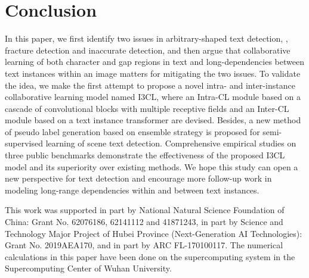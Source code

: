 \section{Conclusion}
In this paper, we first identify two issues in arbitrary-shaped text detection, , fracture detection and inaccurate detection, and then argue that collaborative learning of both character and gap regions in text and long-dependencies between text instances within an image matters for mitigating the two issues. To validate the idea, we make the first attempt to propose a novel intra- and inter-instance collaborative learning model named I3CL, where an Intra-CL module based on a cascade of convolutional blocks with multiple receptive fields and an Inter-CL module based on a text instance transformer are devised. Besides, a new method of pseudo label generation based on ensemble strategy is proposed for semi-supervised learning of scene text detection. Comprehensive empirical studies on three public benchmarks demonstrate the effectiveness of the proposed I3CL model and its superiority over existing methods. We hope this study can open a new perspective for text detection and encourage more follow-up work in modeling long-range dependencies within and between text instances.





\begin{acknowledgements}
This work was supported in part by National Natural Science Foundation of China: Grant No. 62076186, 62141112 and 41871243, in part by Science and Technology Major Project of Hubei Province (Next-Generation AI Technologies): Grant No. 2019AEA170, and in part by ARC FL-170100117. The numerical calculations in this paper have been done on the supercomputing system in the Supercomputing Center of Wuhan University.
\end{acknowledgements}





         




